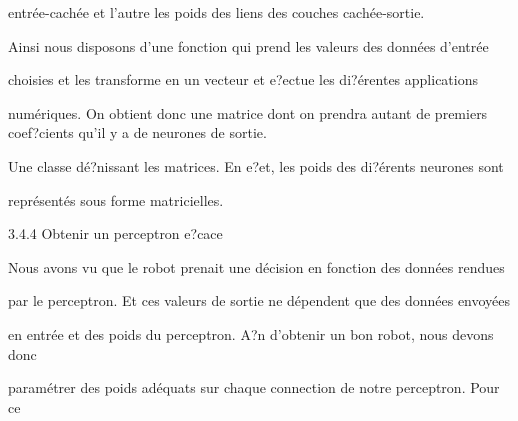 \documentclass[a4paper,portrait,12pt]{article}
\begin{document}
\begin{flushleft}
entr\'{e}e-cach\'{e}e et l'autre les poids des liens des couches cach\'{e}e-sortie.
\end{flushleft}


\begin{flushleft}
Ainsi nous disposons d'une fonction qui prend les valeurs des donn\'{e}es d'entr\'{e}e
\end{flushleft}


\begin{flushleft}
choisies et les transforme en un vecteur et e?ectue les di?\'{e}rentes applications
\end{flushleft}


\begin{flushleft}
num\'{e}riques. On obtient donc une matrice dont on prendra autant de premiers coef?cients qu'il y a de neurones de sortie.
\end{flushleft}


\begin{flushleft}
Une classe d\'{e}?nissant les matrices. En e?et, les poids des di?\'{e}rents neurones sont
\end{flushleft}


\begin{flushleft}
repr\'{e}sent\'{e}s sous forme matricielles.
\end{flushleft}





\begin{flushleft}
3.4.4 Obtenir un perceptron e?cace
\end{flushleft}


\begin{flushleft}
Nous avons vu que le robot prenait une d\'{e}cision en fonction des donn\'{e}es rendues
\end{flushleft}


\begin{flushleft}
par le perceptron. Et ces valeurs de sortie ne d\'{e}pendent que des donn\'{e}es envoy\'{e}es
\end{flushleft}


\begin{flushleft}
en entr\'{e}e et des poids du perceptron. A?n d'obtenir un bon robot, nous devons donc
\end{flushleft}


\begin{flushleft}
param\'{e}trer des poids ad\'{e}quats sur chaque connection de notre perceptron. Pour ce
\end{flushleft}
\end{document}
